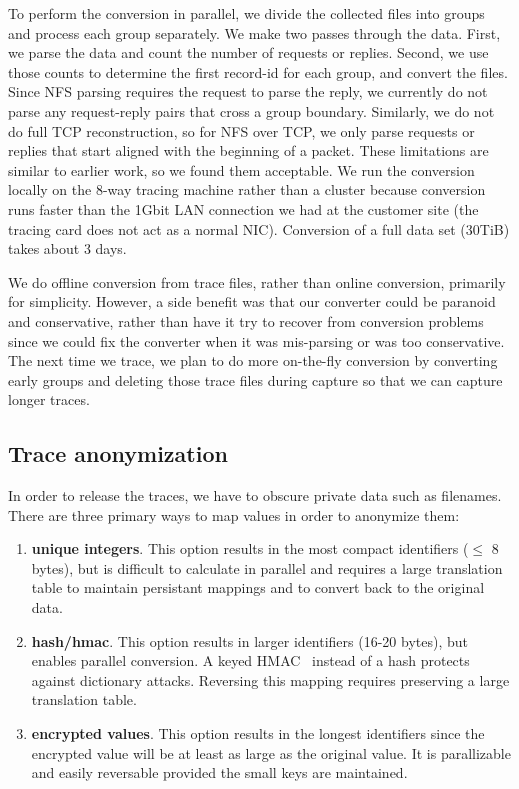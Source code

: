 To perform the conversion in parallel, we divide the collected files
into groups and process each group separately.  We make two passes
through the data.  First, we parse the data and count the number of
requests or replies.  Second, we use those counts to determine the
first record-id for each group, and convert the files.  Since NFS
parsing requires the request to parse the reply, we currently do not
parse any request-reply pairs that cross a group boundary.  Similarly,
we do not do full TCP reconstruction, so for NFS over TCP, we only
parse requests or replies that start aligned with the beginning of a
packet. These limitations are similar to earlier work, so we found
them acceptable.   We run the conversion locally on the 8-way tracing
machine rather than a cluster because conversion runs faster than the
1Gbit LAN connection we had at the customer site (the tracing card
does not act as a normal NIC).  Conversion of a full data set (30TiB)
takes about 3 days.

We do offline conversion from trace files, rather than online conversion, primarily for simplicity.
However, a side benefit was that our converter could be
paranoid and conservative, rather than have it try to recover from
conversion problems since we could fix the converter when it was
mis-parsing or was too conservative.  The next time we trace, we plan
to do more on-the-fly conversion by converting early groups and
deleting those trace files during capture so that we can capture
longer traces.

\subsection{Trace anonymization}

In order to release the traces, we have to obscure private data such
as filenames.  There are three primary ways to map values in order to
anonymize them:

\begin{enumerate}

\item {\bf unique integers}.  This option results in the
most compact identifiers ($\leq$ 8 bytes), but is difficult to
calculate in parallel and requires a large translation table to
maintain persistant mappings and to convert back to the original data.

\item {\bf hash/hmac}.  This option results in larger identifiers
(16-20 bytes), but enables parallel conversion.  A keyed
HMAC~\cite{Bellare96keyinghash} instead of a hash protects against
dictionary attacks.  Reversing this mapping requires preserving a
large translation table.

\item {\bf encrypted values}.  This option results in
the longest identifiers since the encrypted value will be at least as
large as the original value.  It is parallizable and easily reversable
provided the small keys are maintained.

\end{enumerate}

